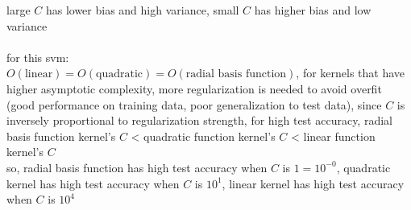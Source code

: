 \documentclass[12pt, border = 4pt, multi]{article} %
\begin{document}
large $C$ has lower bias and high variance, small $C$ has higher bias and low variance\\
\\
for this svm:\\
$O(\text{linear}) = O(\text{quadratic}) = O(\text{radial basis function})$, for kernels that have higher asymptotic complexity, more regularization is needed to avoid overfit (good performance on training data, poor generalization to test data), since $C$ is inversely proportional to regularization strength, for high test accuracy, radial basis function kernel's $C$ < quadratic function kernel's $C$ < linear function kernel's $C$\\
so, radial basis function has high test accuracy when $C$ is $1 = 10 ^ {-0}$, quadratic kernel has high test accuracy when $C$ is $10 ^ 1$, linear kernel has high test accuracy when $C$ is $10 ^ 4$\\
\end{document}
